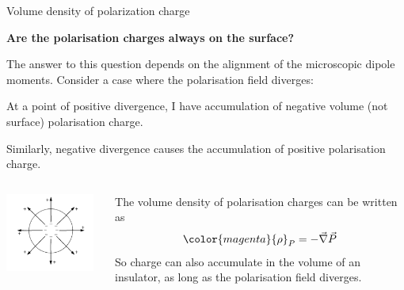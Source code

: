 \begin{frame}{Volume density of polarization charge}

{\bf Are the polarisation charges always on the surface?}\\
\vspace{0.1cm}

The answer to this question depends on the alignment of the microscopic dipole moments.
Consider a case where the polarisation field diverges:
\begin{itemize}
{\small
  \item At a point of positive divergence, I have accumulation of negative volume
        (not surface) polarisation charge.
  \item Similarly, negative divergence causes the accumulation of positive polarisation charge.
}
\end{itemize}

\begin{columns}
  \begin{column}{0.35\textwidth}
   \begin{center}
     \includegraphics[width=0.95\textwidth]{./images/schematics/divergent_polarization.png}\\
   \end{center}
  \end{column}
  \begin{column}{0.65\textwidth}
     The volume density of polarisation charges can be written as
     \begin{equation*}
       {\color{magenta} {\rho}_P = - \vec{\nabla} \vec{P}}
     \end{equation*}
     So charge can also accumulate in the volume of an insulator,
     as long as the polarisation field diverges.
  \end{column}
\end{columns}

\end{frame}

